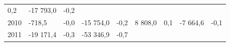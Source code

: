 \begin{longtable}[]{@{}lllllllll@{}}
\begin{minipage}[t]{0.06\columnwidth}
0,2\strut
\end{minipage} & \begin{minipage}[t]{0.09\columnwidth}\raggedright
-17 793,0\strut
\end{minipage} & \begin{minipage}[t]{0.06\columnwidth}\raggedright
-0,2\strut
\end{minipage}\tabularnewline
\begin{minipage}[t]{0.05\columnwidth}\raggedright
2010\strut
\end{minipage} & \begin{minipage}[t]{0.10\columnwidth}\raggedright
-718,5\strut
\end{minipage} & \begin{minipage}[t]{0.06\columnwidth}\raggedright
-0,0\strut
\end{minipage} & \begin{minipage}[t]{0.16\columnwidth}\raggedright
-15 754,0\strut
\end{minipage} & \begin{minipage}[t]{0.06\columnwidth}\raggedright
-0,2\strut
\end{minipage} & \begin{minipage}[t]{0.12\columnwidth}\raggedright
8 808,0\strut
\end{minipage} & \begin{minipage}[t]{0.06\columnwidth}\raggedright
0,1\strut
\end{minipage} & \begin{minipage}[t]{0.09\columnwidth}\raggedright
-7 664,6\strut
\end{minipage} & \begin{minipage}[t]{0.06\columnwidth}\raggedright
-0,1\strut
\end{minipage}\tabularnewline
\begin{minipage}[t]{0.05\columnwidth}\raggedright
2011\strut
\end{minipage} & \begin{minipage}[t]{0.10\columnwidth}\raggedright
-19 171,4\strut
\end{minipage} & \begin{minipage}[t]{0.06\columnwidth}\raggedright
-0,3\strut
\end{minipage} & \begin{minipage}[t]{0.16\columnwidth}\raggedright
-53 346,9\strut
\end{minipage} & \begin{minipage}[t]{0.06\columnwidth}\raggedright
-0,7\strut
\end{minipage} & \begin{minipage}[t]{0.12\columnwidth}\raggedright

\end{minipage}
\end{longtable}
